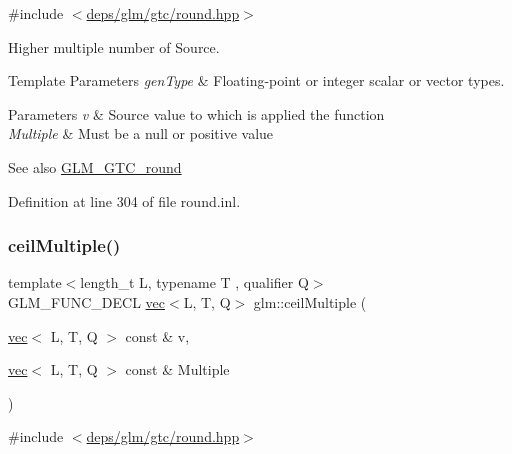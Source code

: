 {\ttfamily \#include $<$\hyperlink{round_8hpp}{deps/glm/gtc/round.\+hpp}$>$}

Higher multiple number of Source.


\begin{DoxyTemplParams}{Template Parameters}
{\em gen\+Type} & Floating-\/point or integer scalar or vector types.\\
\hline
\end{DoxyTemplParams}

\begin{DoxyParams}{Parameters}
{\em v} & Source value to which is applied the function \\
\hline
{\em Multiple} & Must be a null or positive value\\
\hline
\end{DoxyParams}
\begin{DoxySeeAlso}{See also}
\hyperlink{group__gtc__round}{G\+L\+M\+\_\+\+G\+T\+C\+\_\+round} 
\end{DoxySeeAlso}


Definition at line 304 of file round.\+inl.

\mbox{\label{group__gtc__round_gab77fdcc13f8e92d2e0b1b7d7aeab8e9d}} 
\subsubsection{\texorpdfstring{ceil\+Multiple()}{ceilMultiple()}\hspace{0.1cm}{\footnotesize\ttfamily [2/2]}}
{\footnotesize\ttfamily template$<$length\+\_\+t L, typename T , qualifier Q$>$ \\
G\+L\+M\+\_\+\+F\+U\+N\+C\+\_\+\+D\+E\+CL \hyperlink{structglm_1_1vec}{vec}$<$L, T, Q$>$ glm\+::ceil\+Multiple (\begin{DoxyParamCaption}\item[{\hyperlink{structglm_1_1vec}{vec}$<$ L, T, Q $>$ const \&}]{v,  }\item[{\hyperlink{structglm_1_1vec}{vec}$<$ L, T, Q $>$ const \&}]{Multiple }\end{DoxyParamCaption})}



{\ttfamily \#include $<$\hyperlink{round_8hpp}{deps/glm/gtc/round.\+hpp}$>$}

